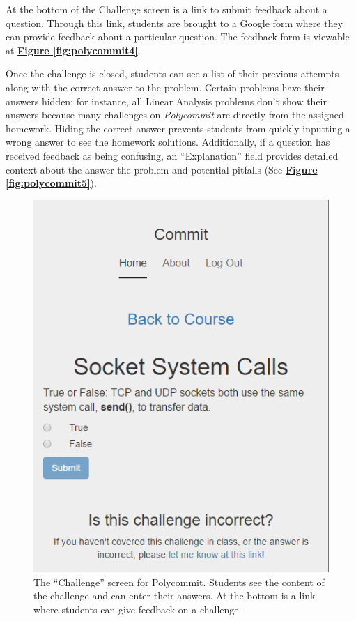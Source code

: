 \par At the bottom of the Challenge screen is a link to submit feedback about a question. Through this link, students are brought to a Google form where they can provide feedback about a particular question. The feedback form is viewable at \textbf{\hyperref[fig:polycommit4]{Figure \ref*{fig:polycommit4}}}.

\par Once the challenge is closed, students can see a list of their previous attempts along with the correct answer to the problem. Certain problems have their answers hidden; for instance, all Linear Analysis problems don't show their answers because many challenges on \textit{Polycommit} are directly from the assigned homework. Hiding the correct answer prevents students from quickly inputting a wrong answer to see the homework solutions. Additionally, if a question has received feedback as being confusing, an ``Explanation'' field provides detailed context about the answer the problem and potential pitfalls (See  \textbf{\hyperref[fig:polycommit5]{Figure \ref*{fig:polycommit5}}}).

\begin{figure}
	\includegraphics{figures/pc-question}
	\caption{The ``Challenge'' screen for Polycommit. Students see the content of the challenge and can enter their answers. At the bottom is a link where students can give feedback on a challenge.}
	\label{fig:polycommit3}
\end{figure}


